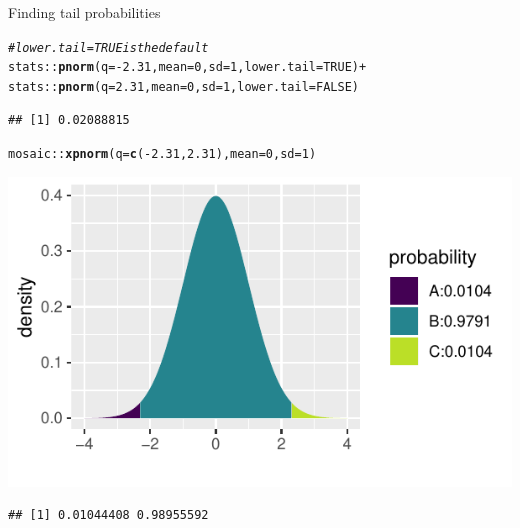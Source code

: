 \documentclass[handout]{beamer}\usepackage[]{graphicx}\usepackage[]{color}
\newcommand{\hlnum}[1]{\textcolor[rgb]{0.686,0.059,0.569}{#1}}%
\newcommand{\hlcom}[1]{\textcolor[rgb]{0.678,0.584,0.686}{\textit{#1}}}%
\newcommand{\hlopt}[1]{\textcolor[rgb]{0,0,0}{#1}}%
\newcommand{\hlstd}[1]{\textcolor[rgb]{0.345,0.345,0.345}{#1}}%
\newcommand{\hlkwc}[1]{\textcolor[rgb]{0.333,0.667,0.333}{#1}}%
\newcommand{\hlkwd}[1]{\textcolor[rgb]{0.737,0.353,0.396}{\textbf{#1}}}%
\newenvironment{knitrout}{}{} %
\begin{document}
\begin{frame}[fragile]{Finding tail probabilities}



\begin{knitrout}\scriptsize
{}\color{fgcolor}
\begin{alltt}
\hlcom{# lower.tail = TRUE is the default}
\hlstd{stats}\hlopt{::}\hlkwd{pnorm}\hlstd{(}\hlkwc{q} \hlstd{=} \hlopt{-}\hlnum{2.31}\hlstd{,} \hlkwc{mean} \hlstd{=} \hlnum{0}\hlstd{,} \hlkwc{sd} \hlstd{=} \hlnum{1}\hlstd{,} \hlkwc{lower.tail} \hlstd{=} \hlnum{TRUE}\hlstd{)} \hlopt{+}
\hlstd{stats}\hlopt{::}\hlkwd{pnorm}\hlstd{(}\hlkwc{q} \hlstd{=} \hlnum{2.31}\hlstd{,} \hlkwc{mean} \hlstd{=} \hlnum{0}\hlstd{,} \hlkwc{sd} \hlstd{=} \hlnum{1}\hlstd{,} \hlkwc{lower.tail} \hlstd{=} \hlnum{FALSE}\hlstd{)}
\end{alltt}
\begin{verbatim}
## [1] 0.02088815
\end{verbatim}

\end{knitrout}

\pause 

\begin{knitrout}\scriptsize
{}\color{fgcolor}
\begin{alltt}
\hlstd{mosaic}\hlopt{::}\hlkwd{xpnorm}\hlstd{(}\hlkwc{q} \hlstd{=} \hlkwd{c}\hlstd{(}\hlopt{-}\hlnum{2.31}\hlstd{,}\hlnum{2.31}\hlstd{),} \hlkwc{mean} \hlstd{=} \hlnum{0}\hlstd{,} \hlkwc{sd} \hlstd{=} \hlnum{1}\hlstd{)}
\end{alltt}


{\centering \includegraphics[width=0.6\linewidth]{figure/probs7-1} 

}


\begin{verbatim}
## [1] 0.01044408 0.98955592
\end{verbatim}

\end{knitrout}


\end{frame}
\end{document}

